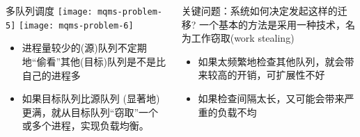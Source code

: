 \begin{frame}
	\begin{columns}
		\begin{column}{.5\textwidth}
			\Large \centering
			多队列调度
			\texttt{[image: mqms-problem-5]}
			\texttt{[image: mqms-problem-6]}	
			
			\normalsize
			
			\begin{itemize}
				\item 进程量较少的(源)队列不定期地“偷看”其他(目标)队列是不是比自己的进程多
				\item 如果目标队列比源队列 (显著地)更满，就从目标队列“窃取”一个或多个进程，实现负载均衡。
				
			\end{itemize}

		
		\end{column}
		
		\begin{column}{.5\textwidth}
			\begin{block}{关键问题：系统如何决定发起这样的迁移?}
				一个基本的方法是采用一种技术，名为工作窃取(work stealing)
			\end{block} 
			\pause
			\normalsize
		
			\begin{itemize}
				\item 如果太频繁地检查其他队列，就会带来较高的开销，可扩展性不好
				\item 如果检查间隔太长，又可能会带来严重的负载不均
			\end{itemize}

			
		\end{column}
	\end{columns}
\end{frame}






